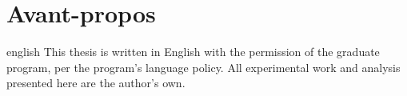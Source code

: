 \chapter*{Avant-propos}
\label{chap-avant-propos}

\begin{otherlanguage*}{english}
This thesis is written in English with the permission of the graduate
program, per the program's language policy. All experimental work and
analysis presented here are the author's own.
\end{otherlanguage*}
